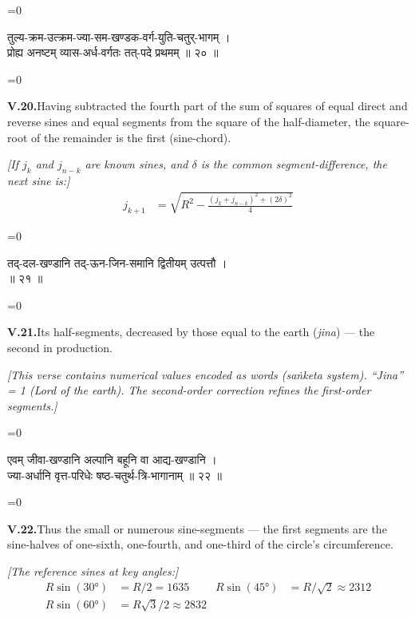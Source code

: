 \documentclass[11pt,a4paper]{article}
\newcommand{\dev}[1]{{\devanagarifont\color{sktcolor}#1}}
\newcommand{\iast}[1]{\textit{#1}}
\newenvironment{paracol}[1]{\begingroup}{\endgroup}
\newcommand{\switchcolumn}[1][]{%
  \ifnum#1=0\relax\else\par\nobreak\vspace{0.5em}\par\nobreak\fi%
}
\begin{document}
\vspace{0.3cm}

\begin{paracol}{2}
\switchcolumn[0]
\dev{%
तुल्य-क्रम-उत्क्रम-ज्या-सम-खण्डक-वर्ग-युति-चतुर्-भागम् ।\\
प्रोह्य अनष्टम् व्यास-अर्ध-वर्गतः तत्-पदे प्रथमम् ॥ २० ॥
}

\switchcolumn[1]
\textbf{V.20.}\quad Having subtracted the fourth part of the sum
of squares of equal direct and reverse sines and equal segments
from the square of the half-diameter, the square-root of the
remainder is the first (sine-chord).

\medskip
\textit{[If $j_k$ and $j_{n-k}$ are known sines, and $\delta$ is the
common segment-difference, the next sine is:]}
\begin{align*}
j_{k+1} &= \sqrt{R^2 - \frac{(j_k + j_{n-k})^2 + (2\delta)^2}{4}}
\end{align*}
\end{paracol}

\vspace{0.3cm}

\begin{paracol}{2}
\switchcolumn[0]
\dev{%
तद्-दल-खण्डानि तद्-ऊन-जिन-समानि द्वितीयम् उत्पत्तौ ।\\
[संख्या-वाचकैः अक्षरैः संकेतितानि] ॥ २१ ॥
}

\switchcolumn[1]
\textbf{V.21.}\quad Its half-segments, decreased by those equal to
the earth (\iast{jina}) — the second in production.

\medskip
\textit{[This verse contains numerical values encoded as words
(\iast{saṅketa} system). ``Jina'' = 1 (Lord of the earth). The
second-order correction refines the first-order segments.]}
\end{paracol}

\vspace{0.3cm}

\begin{paracol}{2}
\switchcolumn[0]
\dev{%
एवम् जीवा-खण्डानि अल्पानि बहूनि वा आद्य-खण्डानि ।\\
ज्या-अर्धानि वृत्त-परिधेः षष्ठ-चतुर्थ-त्रि-भागानाम् ॥ २२ ॥
}

\switchcolumn[1]
\textbf{V.22.}\quad Thus the small or numerous sine-segments —
the first segments are the sine-halves of one-sixth, one-fourth,
and one-third of the circle's circumference.

\medskip
\textit{[The reference sines at key angles:]}
\begin{align*}
R\sin(30°) &= R/2 = 1635 & R\sin(45°) &= R/\sqrt{2} \approx 2312\\
R\sin(60°) &= R\sqrt{3}/2 \approx 2832
\end{align*}
\end{paracol}
\end{document}
